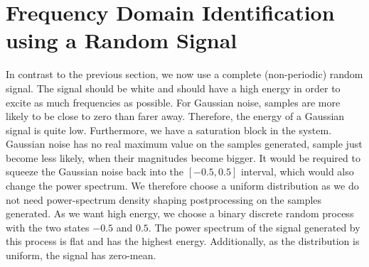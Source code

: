 \documentclass{scrartcl}
\begin{document}
\clearpage
\section{Frequency Domain Identification using a Random Signal}

In contrast to the previous section, we now use a complete (non-periodic) random signal.
The signal should be white and should have a high energy in order to excite as much frequencies as possible. 
For Gaussian noise, samples are more likely to be close to zero than farer away. Therefore, the energy of a Gaussian signal is quite low.
Furthermore, we have a saturation block in the system.
Gaussian noise has no real maximum value on the samples generated, sample just become less likely, when their magnitudes become bigger.
It would be required to squeeze the Gaussian noise back into the $[-0.5, 0.5]$ interval, which would also change the power spectrum.
We therefore choose a uniform distribution as we do not need power-spectrum density shaping postprocessing on the samples generated.
As we want high energy, we choose a binary discrete random process with the two states $-0.5$ and $0.5$.
The power spectrum of the signal generated by this process is flat and has the highest energy.
Additionally, as the distribution is uniform, the signal has zero-mean.
\end{document}
